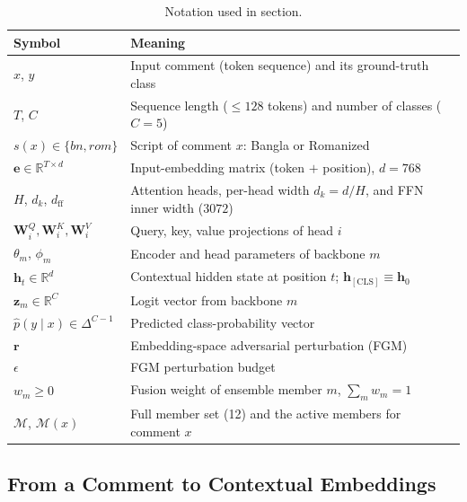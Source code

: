 \documentclass[11pt,a4paper]{article}
\def\cref#1{section}%
\def\textsc#1{#1}%
\begin{document}
\begin{table}[!htbp]
\centering
\caption{Notation used in \cref{sec:methodology}.}
\label{tab:notation}
\small
\begin{tabularx}{\textwidth}{@{}lX@{}}
\toprule
\textbf{Symbol} & \textbf{Meaning} \\
\midrule
$x$, $y$ & Input comment (token sequence) and its ground-truth class \\
$T$, $C$ & Sequence length ($\le 128$ tokens) and number of classes ($C = 5$) \\
$s(x) \in \{\textsc{bn}, \textsc{rom}\}$ & Script of comment $x$: Bangla or Romanized \\
$\mathbf{e} \in \mathbb{R}^{T \times d}$ & Input-embedding matrix (token $+$ position), $d = 768$ \\
$H$, $d_k$, $d_{\mathrm{ff}}$ & Attention heads, per-head width $d_k = d/H$, and FFN inner width ($3072$) \\
$\mathbf{W}^Q_i, \mathbf{W}^K_i, \mathbf{W}^V_i$ & Query, key, value projections of head $i$ \\
$\theta_m$, $\phi_m$ & Encoder and head parameters of backbone $m$ \\
$\mathbf{h}_t \in \mathbb{R}^{d}$ & Contextual hidden state at position $t$; $\mathbf{h}_{[\mathrm{CLS}]} \equiv \mathbf{h}_0$ \\
$\mathbf{z}_m \in \mathbb{R}^{C}$ & Logit vector from backbone $m$ \\
$\hat{p}(y \mid x) \in \Delta^{C-1}$ & Predicted class-probability vector \\
$\mathbf{r}$ & Embedding-space adversarial perturbation (FGM) \\
$\epsilon$ & FGM perturbation budget \\
$w_m \ge 0$ & Fusion weight of ensemble member $m$, $\sum_m w_m = 1$ \\
$\mathcal{M}$, $\mathcal{M}(x)$ & Full member set (12) and the active members for comment $x$ \\
\bottomrule
\end{tabularx}
\end{table}

\subsection{From a Comment to Contextual Embeddings}
\label{sec:prelim}
\end{document}
